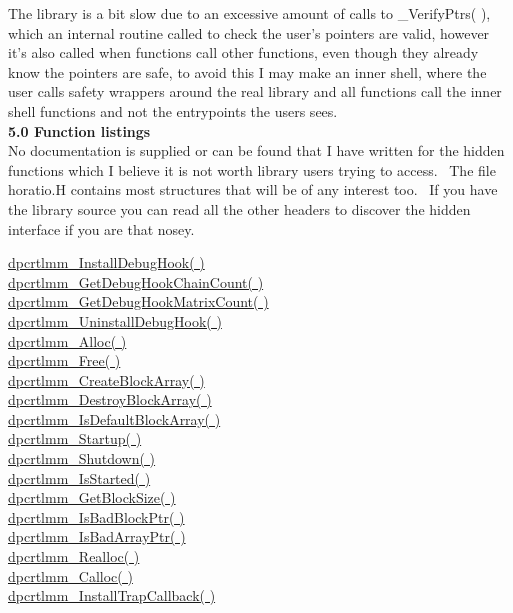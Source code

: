 \documentclass{article}
\begin{document}
\par The library is a bit slow due to an excessive amount of calls to
\_VerifyPtrs(
), which an internal routine called to check the user's pointers are
valid,
however it's also called when functions call other functions, even
though
they already know the pointers are safe, to avoid this I may make an
inner
shell, where the user calls safety wrappers around the real library and
all functions call the inner shell functions and not the entrypoints
the
users sees.
\\
\textbf{5.0 Function listings}
\\
No documentation is supplied or can be found that I have written for
the hidden functions which I believe it is not worth library users
trying
to access.~ The file horatio.H contains most structures that will
be of any interest too.~ If you have the library source you can
read
all the other headers to discover the hidden interface if you are that
nosey.
\par \href{#InstallDebugHook}{dpcrtlmm\_InstallDebugHook( )}
\\
\href{#GetDebugHookChainCount}{dpcrtlmm\_GetDebugHookChainCount(
)}
\\
\href{#GetDebugHookMatrixCount}{dpcrtlmm\_GetDebugHookMatrixCount(
)}
\\
\href{#UninstallDebugHook}{dpcrtlmm\_UninstallDebugHook( )}
\\
\href{#Alloc}{dpcrtlmm\_Alloc( )}
\\
\href{#Free}{dpcrtlmm\_Free( )}
\\
\href{#CreateBlockArray}{dpcrtlmm\_CreateBlockArray( )}
\\
\href{#DestroyBlockArray}{dpcrtlmm\_DestroyBlockArray( )}
\\
\href{#IsDefaultBlockArray}{dpcrtlmm\_IsDefaultBlockArray( )}
\\
\href{#Startup}{dpcrtlmm\_Startup( )}
\\
\href{#Shutdown}{dpcrtlmm\_Shutdown( )}
\\
\href{#IsStarted}{dpcrtlmm\_IsStarted( )}
\\
\href{#GetBlockSize}{dpcrtlmm\_GetBlockSize( )}
\\
\href{#IsBasBlockPtr}{dpcrtlmm\_IsBadBlockPtr( )}
\\
\href{#IsBadArrayPtr}{dpcrtlmm\_IsBadArrayPtr( )}
\\
\href{#Realloc}{dpcrtlmm\_Realloc( )}
\\
\href{#Calloc}{dpcrtlmm\_Calloc( )}
\\
\href{#InstallTrapCallback}{dpcrtlmm\_InstallTrapCallback( )}
\end{document}
